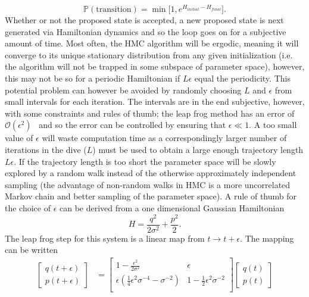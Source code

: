 \begin{equation}
	\mathbb{P}(\text{transition})=\min\big[1,e^{H_{initial}-H_{final}}\big].
	\label{pro}
\end{equation}
Whether or not the proposed state is accepted, a new proposed state is next generated via Hamiltonian dynamics and so the loop goes on for a subjective amount of time. \newline
Most often, the HMC algorithm will be ergodic, meaning it will converge to its unique stationary distribution from any given initialization (i.e. the algorithm will not be trapped in some subspace of parameter space), however, this may not be so for a periodic Hamiltonian if $L\epsilon$ equal the periodicity. This potential problem can however be avoided by randomly choosing $L$ and $\epsilon$ from small intervals for each iteration. The intervals are in the end subjective, however, with some constraints and rules of thumb; the leap frog method has an error of $\mathcal{O}(\epsilon^2)$~\citep{Neal:1996} and so the error can be controlled by ensuring that $\epsilon\ll1$. A too small value of $\epsilon$ will waste computation time as a correspondingly larger number of iterations in the dive ($L$) must be used to obtain a large enough trajectory length $L\epsilon$. If the trajectory length is too short the parameter space will be slowly explored by a random walk instead of the otherwise approximately independent sampling (the advantage of non-random walks in HMC is a more uncorrelated Markov chain and better sampling of the parameter space). A rule of thumb for the choice of $\epsilon$ can be derived from a one dimensional Gaussian Hamiltonian
\begin{equation}
	H=\frac{q^2}{2\sigma^2}+\frac{p^2}{2}.
	\label{ghf}
\end{equation}
The leap frog step for this system is a linear map from $t\rightarrow t+\epsilon$. The mapping can be written
\begin{equation}
	\begin{split}
		\begin{bmatrix}
			q(t+\epsilon)\\
			p(t+\epsilon)
		\end{bmatrix}&=\begin{bmatrix}
			1-\frac{\epsilon^2}{2\sigma^2}& \epsilon\\
			\epsilon(\frac{1}{4}\epsilon^2\sigma^{-4}-\sigma^{-2}) & 1-\frac{1}{2}\epsilon^2\sigma^{-2}\\
		\end{bmatrix}\begin{bmatrix}
			q(t)\\
			p(t)
		\end{bmatrix}\\
	\end{split}
\end{equation}
